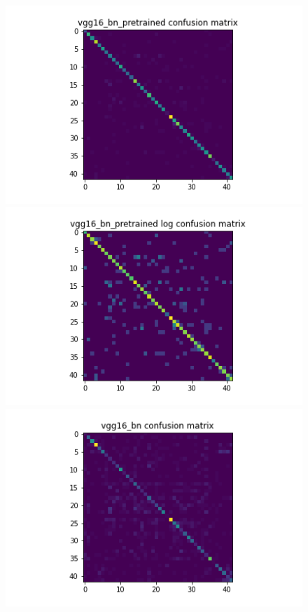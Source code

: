 \begin{figure}[H]
  \begin{minipage}[b]{.5\linewidth}
    \centering
    \includegraphics[width=1.2\textwidth]{figs/conf_matrix/vgg16_bn_pretrained_conf.png}
  \end{minipage}
  \hfill
  \begin{minipage}[b]{.5\linewidth}
    \centering
    \includegraphics[width=1.2\textwidth]{figs/conf_matrix/vgg16_bn_pretrained_log_conf.png}
  \end{minipage}
  \vfill
  \begin{minipage}[b]{.5\linewidth}
    \centering
    \includegraphics[width=1.2\textwidth]{figs/conf_matrix/vgg16_bn_conf.png}

\end{minipage}
\end{figure}
